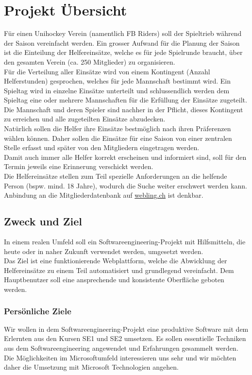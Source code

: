 \chapter{Projekt Übersicht}
Für einen Unihockey Verein (namentlich FB Riders) soll der Spieltrieb während der Saison vereinfacht werden. Ein grosser Aufwand für die Planung der Saison ist die Einteilung der Helfereinsätze, welche es für jede Spielrunde braucht, über den gesamten Verein (ca. 250 Mitglieder) zu organisieren.
\\

Für die Verteilung aller Einsätze wird von einem Kontingent (Anzahl Helferstunden) gesprochen, welches für jede Mannschaft bestimmt wird. Ein Spieltag wird in einzelne Einsätze unterteilt und schlussendlich werden dem Spieltag eine oder mehrere Mannschaften für die Erfüllung der Einsätze zugeteilt. Die Mannschaft und deren Spieler sind nachher in der Pflicht, dieses Kontingent zu erreichen und alle zugeteilten Einsätze abzudecken.
\\
Natürlich sollen die Helfer ihre Einsätze bestmöglich nach ihren Präferenzen wählen können. Daher sollen die Einsätze für eine Saison von einer zentralen Stelle erfasst und später von den Mitgliedern eingetragen werden.
\\
Damit auch immer alle Helfer korrekt erscheinen und informiert sind, soll für den Termin jeweils eine Erinnerung verschickt werden. 
\\
Die Helfereinsätze stellen zum Teil spezielle Anforderungen an die helfende Person (bspw. mind. 18 Jahre), wodurch die Suche weiter erschwert werden kann. 
\\
Anbindung an die Mitgliederdatenbank auf \href{http://www.webling.ch/}{webling.ch} ist denkbar. 

\section{Zweck und Ziel}
In einem realen Umfeld soll ein Softwareengineering-Projekt mit Hilfsmitteln, die heute oder in naher Zukunft verwendet werden, umgesetzt werden. 
\\
Das Ziel ist eine funktionierende Webplattform, welche die Abwicklung der Helfereinsätze zu einem Teil automatisiert und grundlegend vereinfacht. Dem Hauptbenutzer soll eine ansprechende und konsistente Oberfläche geboten werden.

\subsection{Persönliche Ziele}
Wir wollen in dem Softwareengineering-Projekt eine produktive Software mit dem Erlernten aus den Kursen SE1 und SE2 umsetzen. Es sollen essentielle Techniken aus dem Softwareengineering angewendet und Erfahrungen gesammelt werden. Die Möglichkeiten im Microsoftumfeld interessieren uns sehr und wir möchten daher die Umsetzung mit Microsoft Technologien angehen.

